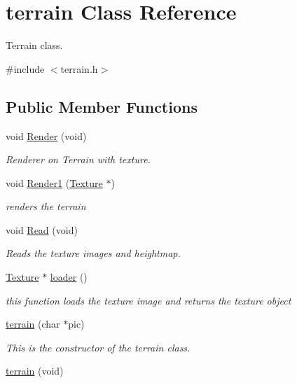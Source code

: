 \hypertarget{classterrain}{\section{terrain \-Class \-Reference}
\label{classterrain}
}


\-Terrain class.  




{\ttfamily \#include $<$terrain.\-h$>$}

\subsection*{\-Public \-Member \-Functions}
\begin{DoxyCompactItemize}
\item 
void \hyperlink{classterrain_ae75762648c90ea43d96682f14c4ca959}{\-Render} (void)
\begin{DoxyCompactList}\small\item\em \-Renderer on \-Terrain with texture. \end{DoxyCompactList}\item 
void \hyperlink{classterrain_a0bbd83dd3fcae5e98a742426ca0952f7}{\-Render1} (\hyperlink{classTexture}{\-Texture} $\ast$)
\begin{DoxyCompactList}\small\item\em renders the terrain \end{DoxyCompactList}\item 
void \hyperlink{classterrain_ac759516ced9ff5622a4582f4655a68e4}{\-Read} (void)
\begin{DoxyCompactList}\small\item\em \-Reads the texture images and heightmap. \end{DoxyCompactList}\item 
\hypertarget{classterrain_aea15f6c1fa249f9ad1eec58dda2142b4}{\hyperlink{classTexture}{\-Texture} $\ast$ \hyperlink{classterrain_aea15f6c1fa249f9ad1eec58dda2142b4}{loader} ()}\label{classterrain_aea15f6c1fa249f9ad1eec58dda2142b4}

\begin{DoxyCompactList}\small\item\em this function loads the texture image and returns the texture object \end{DoxyCompactList}\item 
\hyperlink{classterrain_ac3b9c935fdc77ecadb4da3cbc5d34c2d}{terrain} (char $\ast$pic)
\begin{DoxyCompactList}\small\item\em \-This is the constructor of the terrain class. \end{DoxyCompactList}\item 
\hypertarget{classterrain_a9c65d395aab1f48e33b84a7d2c90aa8d}{\hyperlink{classterrain_a9c65d395aab1f48e33b84a7d2c90aa8d}{terrain} (void)}\label{classterrain_a9c65d395aab1f48e33b84a7d2c90aa8d}


\end{DoxyCompactItemize}
